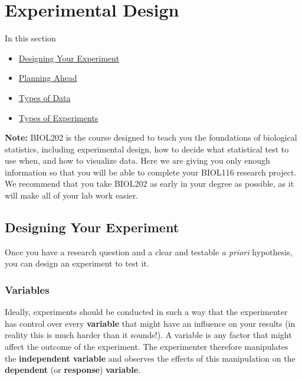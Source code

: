 \documentclass[
]{book}
\providecommand{\tightlist}{%
  \setlength{\itemsep}{0pt}\setlength{\parskip}{0pt}}
\begin{document}
\hypertarget{experimental-design}{%
\section{Experimental Design}\label{experimental-design}}

In this section

\begin{itemize}
\tightlist
\item
  \protect\hyperlink{designing-your-experiment}{Designing Your Experiment}
\item
  \protect\hyperlink{planning-ahead}{Planning Ahead}
\item
  \protect\hyperlink{types-of-data}{Types of Data}
\item
  \protect\hyperlink{types-of-experiments}{Types of Experiments}
\end{itemize}

\textbf{Note:} BIOL202 is the course designed to teach you the foundations of biological statistics, including experimental design, how to decide what statistical test to use when, and how to visualize data. Here we are giving you only enough information so that you will be able to complete your BIOL116 research project. We recommend that you take BIOL202 as early in your degree as possible, as it will make all of your lab work easier.

\hypertarget{designing-your-experiment}{%
\subsection*{Designing Your Experiment}\label{designing-your-experiment}}

Once you have a research question and a clear and testable \emph{a priori} hypothesis, you can design an experiment to test it.

\hypertarget{variables}{%
\subsubsection*{Variables}\label{variables}}

Ideally, experiments should be conducted in such a way that the experimenter has control over every \textbf{variable} that might have an influence on your results (in reality this is much harder than it sounds!). A variable is any factor that might affect the outcome of the experiment. The experimenter therefore manipulates the \textbf{independent variable} and observes the effects of this manipulation on the \textbf{dependent} (or \textbf{response}) \textbf{variable}.
\end{document}
